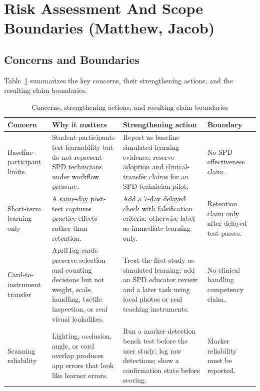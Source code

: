\documentclass[10pt,a4paper]{article}
\begin{document}

\section{Risk Assessment And Scope Boundaries \hfill {\normalfont\small (Matthew, Jacob)}}
\label{sec:risk-assessment-and-scope-boundaries}
\subsection{Concerns and Boundaries}

Table~\ref{tab:concerns-and-boundaries} summarizes the key concerns, their strengthening actions, and the resulting claim boundaries.

\begin{table}[!htb]
\centering
\caption{Concerns, strengthening actions, and resulting claim boundaries}
\label{tab:concerns-and-boundaries}
\small\renewcommand{\arraystretch}{1.15}\setlength{\tabcolsep}{3pt}
\begin{tabularx}{\textwidth}{|>{\raggedright\arraybackslash}p{2.4cm}|>{\raggedright\arraybackslash}X|>{\raggedright\arraybackslash}X|>{\raggedright\arraybackslash}p{2.3cm}|}
\hline
Concern & Why it matters & Strengthening action & Boundary \\
\hline
Baseline participant limits & Student participants test learnability but do not represent SPD technicians under workflow pressure. & Report as baseline simulated-learning evidence; reserve adoption and clinical-transfer claims for an SPD technician pilot. & No SPD effectiveness claim. \\
\hline
Short-term learning only & A same-day post-test captures practice effects rather than retention. & Add a 7-day delayed check with falsification criteria; otherwise label as immediate learning only. & Retention claim only after delayed test passes. \\
\hline
Card-to-instrument transfer & AprilTag cards preserve selection and counting decisions but not weight, scale, handling, tactile inspection, or real visual lookalikes. & Treat the first study as simulated learning; add an SPD educator review and a later task using local photos or real teaching instruments. & No clinical handling competency claim. \\
\hline
Scanning reliability & Lighting, occlusion, angle, or card overlap produces app errors that look like learner errors. & Run a marker-detection bench test before the user study; log raw detections; show a confirmation state before scoring. & Marker reliability must be reported. \\

\end{tabularx}
\end{table}
\end{document}
